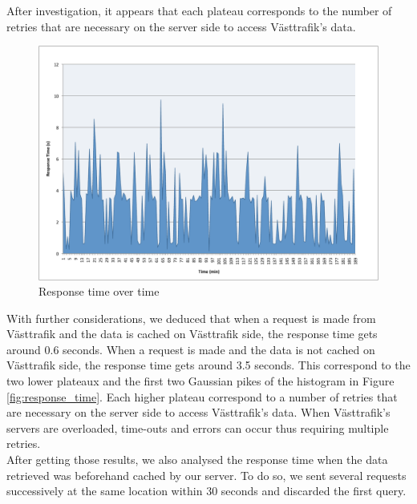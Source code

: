 After investigation, it appears that each plateau corresponds to the number of retries that are necessary on the server side to access Västtrafik's data.\\

\begin{figure}[ht]
\center
\includegraphics[scale=0.35]{pics/response_time_overtime}
\caption{Response time over time}
\label{fig:response_time_overtime}
\end{figure}

With further considerations, we deduced that when a request is made from Västtrafik and the data is cached on Västtrafik side, the response time gets around 0.6 seconds. When a request is made and the data is not cached on Västtrafik side, the response time gets around 3.5 seconds. This correspond to the two lower plateaux and the first two Gaussian pikes of the histogram in Figure \ref{fig:response_time}. Each higher plateau correspond to a number of retries that are necessary on the server side to access Västtrafik's data. When Västtrafik's servers are overloaded, time-outs and errors can occur thus requiring multiple retries.\\

After getting those results, we also analysed the response time when the data retrieved was beforehand cached by our server. To do so, we sent several requests successively at the same location within 30 seconds and discarded the first query.\\

